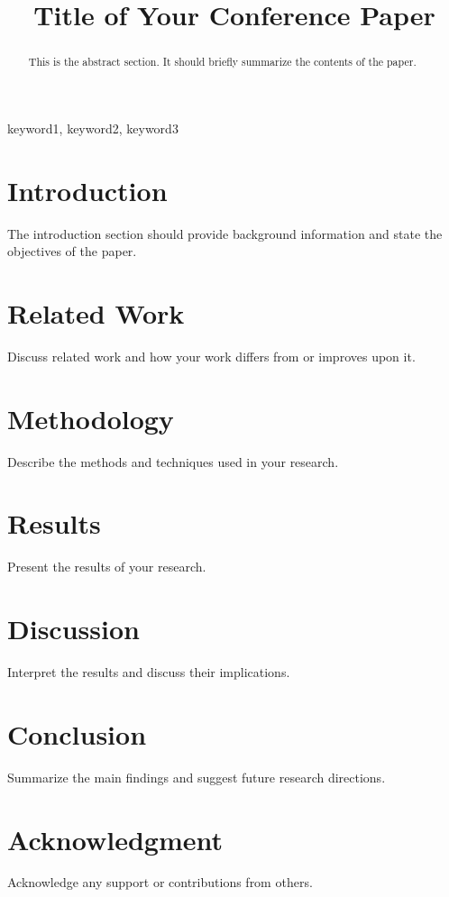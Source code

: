 \documentclass[conference]{IEEEtran}
\begin{document}
\title{Title of Your Conference Paper}

\author{
\and
{}
}

\maketitle

\begin{abstract}
This is the abstract section. It should briefly summarize the contents of the paper.
\end{abstract}

\begin{IEEEkeywords}
keyword1, keyword2, keyword3
\end{IEEEkeywords}

\section{Introduction}
The introduction section should provide background information and state the objectives of the paper.

\section{Related Work}
Discuss related work and how your work differs from or improves upon it.

\section{Methodology}
Describe the methods and techniques used in your research.

\section{Results}
Present the results of your research.

\section{Discussion}
Interpret the results and discuss their implications.

\section{Conclusion}
Summarize the main findings and suggest future research directions.

\section*{Acknowledgment}
Acknowledge any support or contributions from others.



\end{document}
